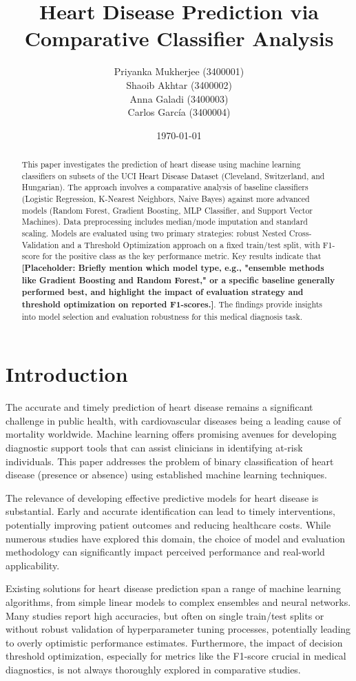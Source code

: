 \documentclass{article}
\title{Heart Disease Prediction via Comparative Classifier Analysis} %
\author{
    Priyanka Mukherjee (3400001) \\
    Shaoib Akhtar (3400002) \\
    Anna Galadi (3400003) \\
    Carlos García (3400004)
}
\date{\today}
\begin{document}
\maketitle
\begin{abstract}
This paper investigates the prediction of heart disease using machine learning classifiers on subsets of the UCI Heart Disease Dataset (Cleveland, Switzerland, and Hungarian). The approach involves a comparative analysis of baseline classifiers (Logistic Regression, K-Nearest Neighbors, Naive Bayes) against more advanced models (Random Forest, Gradient Boosting, MLP Classifier, and Support Vector Machines). Data preprocessing includes median/mode imputation and standard scaling. Models are evaluated using two primary strategies: robust Nested Cross-Validation and a Threshold Optimization approach on a fixed train/test split, with F1-score for the positive class as the key performance metric. Key results indicate that \textbf{[Placeholder: Briefly mention which model type, e.g., "ensemble methods like Gradient Boosting and Random Forest," or a specific baseline generally performed best, and highlight the impact of evaluation strategy and threshold optimization on reported F1-scores.]}. The findings provide insights into model selection and evaluation robustness for this medical diagnosis task.
\end{abstract}

\section{Introduction}
The accurate and timely prediction of heart disease remains a significant challenge in public health, with cardiovascular diseases being a leading cause of mortality worldwide. Machine learning offers promising avenues for developing diagnostic support tools that can assist clinicians in identifying at-risk individuals. This paper addresses the problem of binary classification of heart disease (presence or absence) using established machine learning techniques.

The relevance of developing effective predictive models for heart disease is substantial. Early and accurate identification can lead to timely interventions, potentially improving patient outcomes and reducing healthcare costs. While numerous studies have explored this domain, the choice of model and evaluation methodology can significantly impact perceived performance and real-world applicability.

Existing solutions for heart disease prediction span a range of machine learning algorithms, from simple linear models to complex ensembles and neural networks. Many studies report high accuracies, but often on single train/test splits or without robust validation of hyperparameter tuning processes, potentially leading to overly optimistic performance estimates. Furthermore, the impact of decision threshold optimization, especially for metrics like the F1-score crucial in medical diagnostics, is not always thoroughly explored in comparative studies.
\end{document}

